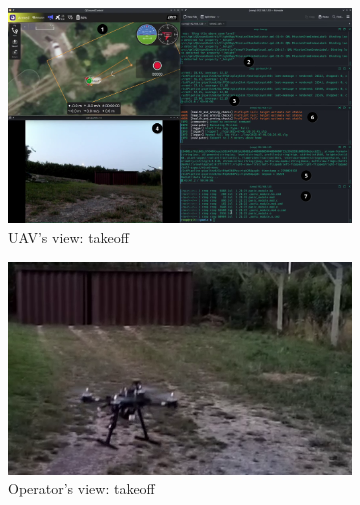 \begin{figure}[!hbt]
  \centering
  \begin{subfigure}[t]{\textwidth}
    \centering
    \includegraphics[width=1.0\textwidth]{./img/png/uspfs-crash-fpv-takeoff-annot} 
    \caption{UAV's view: takeoff}%
    \label{fig:mission-exec-uspfs-takeoff-1}
  \end{subfigure}
%  
  \begin{subfigure}[t]{0.49\textwidth}
    \centering
    \includegraphics[width=0.98\linewidth]{./img/png/uspfs-crash-myView-takeoff-crop} %
    \caption{Operator's view: takeoff}%
    \label{fig:mission-exec-uspfs-takeoff-2}
  \end{subfigure}
%  
  \begin{subfigure}[t]{0.49\textwidth}
    \centering

\end{subfigure}
\end{figure}
